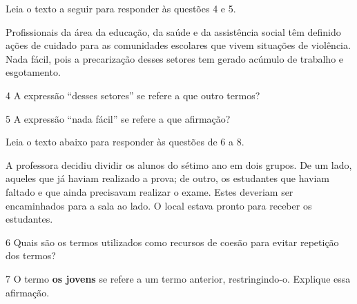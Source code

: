 Leia o texto a seguir para responder às questões 4 e 5.

\begin{myquote}

Profissionais da área da educação, da saúde e da assistência social têm
definido ações de cuidado para as comunidades escolares que vivem
situações de violência. Nada fácil, pois a precarização desses setores
tem gerado acúmulo de trabalho e esgotamento.


\end{myquote}

\num{4} A expressão ``desses setores'' se refere a que outro termos?


\num{5} A expressão ``nada fácil'' se refere a que afirmação?


Leia o texto abaixo para responder às questões de 6 a 8.

\begin{myquote}

A professora decidiu dividir os alunos do sétimo ano em dois grupos. De um
lado, aqueles que já haviam realizado a prova; de outro, os estudantes que
haviam faltado e que ainda precisavam realizar o exame. Estes deveriam
ser encaminhados para a sala ao lado. O local estava pronto para receber
os estudantes.

\end{myquote}

\num{6} Quais são os termos utilizados como recursos de coesão para
evitar repetição dos termos? 


\num{7} O termo \textbf{os jovens} se refere a um termo anterior, restringindo-o. 
Explique essa afirmação.


